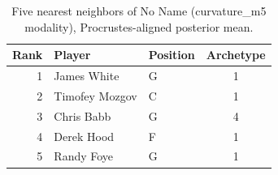 \begin{table}[htbp]
  \centering\small
  \begin{tabular}{rllc}
    \toprule
    Rank & Player & Position & Archetype \\
    \midrule
    1 & James White & G & 1 \\
    2 & Timofey Mozgov & C & 1 \\
    3 & Chris Babb & G & 4 \\
    4 & Derek Hood & F & 1 \\
    5 & Randy Foye & G & 1 \\
    \bottomrule
  \end{tabular}
  \caption{Five nearest neighbors of No Name (curvature_m5 modality), Procrustes-aligned posterior mean.}
  \label{tab:No_Name_neighbors_curvature_m5}
\end{table}

